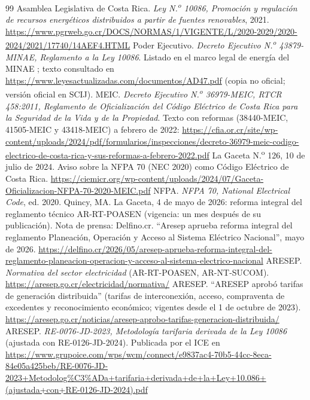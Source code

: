 \documentclass[12pt]{article}
\begin{document}
\begin{thebibliography}{99}
 Asamblea Legislativa de Costa Rica. \emph{Ley N.\textsuperscript{o} 10086, Promoción y regulación de recursos energéticos distribuidos a partir de fuentes renovables}, 2021. \url{https://www.pgrweb.go.cr/DOCS/NORMAS/1/VIGENTE/L/2020-2029/2020-2024/2021/17740/14AEF4.HTML}
 Poder Ejecutivo. \emph{Decreto Ejecutivo N.\textsuperscript{o} 43879-MINAE, Reglamento a la Ley 10086}. Listado en el marco legal de energía del MINAE \cite{minaeMarco}; texto consultado en \url{https://www.leyesactualizadas.com/documentos/AD47.pdf} (copia no oficial; versión oficial en SCIJ).
 MEIC. \emph{Decreto Ejecutivo N.\textsuperscript{o} 36979-MEIC, RTCR 458:2011, Reglamento de Oficialización del Código Eléctrico de Costa Rica para la Seguridad de la Vida y de la Propiedad}. Texto con reformas (38440-MEIC, 41505-MEIC y 43418-MEIC) a febrero de 2022: \url{https://cfia.or.cr/site/wp-content/uploads/2024/pdf/formularios/inspecciones/decreto-36979-meic-codigo-electrico-de-costa-rica-y-sus-reformas-a-febrero-2022.pdf}
 La Gaceta N.\textsuperscript{o} 126, 10 de julio de 2024. Aviso sobre la NFPA 70 (NEC 2020) como Código Eléctrico de Costa Rica. \url{https://ciemicr.org/wp-content/uploads/2024/07/Gaceta-Oficializacion-NFPA-70-2020-MEIC.pdf}
 NFPA. \emph{NFPA 70, National Electrical Code}, ed. 2020. Quincy, MA.
 La Gaceta, 4 de mayo de 2026: reforma integral del reglamento técnico AR-RT-POASEN (vigencia: un mes después de su publicación). Nota de prensa: Delfino.cr. ``Aresep aprueba reforma integral del reglamento Planeación, Operación y Acceso al Sistema Eléctrico Nacional'', mayo de 2026. \url{https://delfino.cr/2026/05/aresep-aprueba-reforma-integral-del-reglamento-planeacion-operacion-y-acceso-al-sistema-electrico-nacional}
 ARESEP. \emph{Normativa del sector electricidad} (AR-RT-POASEN, AR-NT-SUCOM). \url{https://aresep.go.cr/electricidad/normativa/}
 ARESEP. ``ARESEP aprobó tarifas de generación distribuida'' (tarifas de interconexión, acceso, compraventa de excedentes y reconocimiento económico; vigentes desde el 1 de octubre de 2023). \url{https://aresep.go.cr/noticias/aresep-aprobo-tarifas-generacion-distribuida/}
 ARESEP. \emph{RE-0076-JD-2023, Metodología tarifaria derivada de la Ley 10086} (ajustada con RE-0126-JD-2024). Publicada por el ICE en \url{https://www.grupoice.com/wps/wcm/connect/e9837ac4-70b5-44cc-8eca-84e05a425beb/RE-0076-JD-2023+Metodolog\%C3\%ADa+tarifaria+derivada+de+la+Ley+10.086+(ajustada+con+RE-0126-JD-2024).pdf}

\end{thebibliography}
\end{document}

